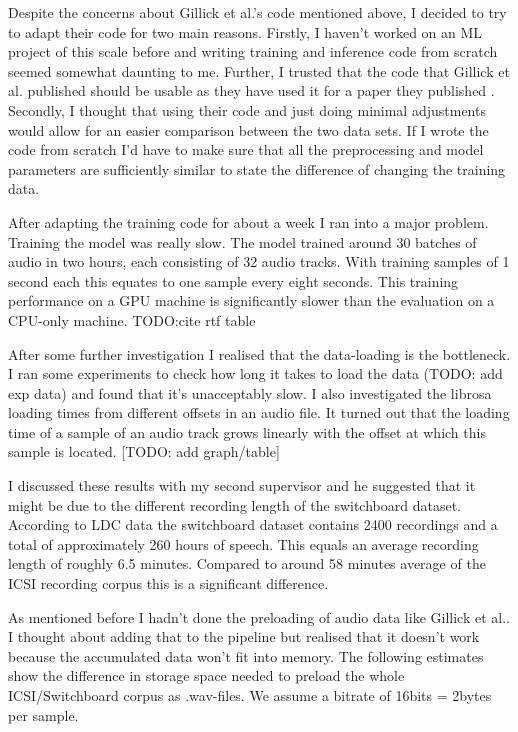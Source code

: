 \documentclass[bsc,frontabs,parskip,deptreport]{infthesis}
\begin{document}
Despite the concerns about Gillick et al.'s code mentioned above, I decided to try to adapt their code for two main reasons. 
Firstly, I haven't worked on an ML project of this scale before and writing training and inference code from scratch seemed somewhat daunting to me. Further, I trusted that the code that Gillick et al. published should be usable as they have used it for a paper they published \cite{gillick2021robust}. 
Secondly, I thought that using their code and just doing minimal adjustments would allow for an easier comparison between the two data sets. If I wrote the code from scratch I'd have to make sure that all the preprocessing and model parameters are sufficiently similar to state the difference of changing the training data. 

After adapting the training code for about a week I ran into a major problem. Training the model was really slow. The model trained around 30 batches of audio in two hours, each consisting of 32 audio tracks. 
With training samples of 1 second each this equates to one sample every eight seconds.
This training performance on a GPU machine is significantly slower than the evaluation on a CPU-only machine. TODO:cite rtf table

After some further investigation I realised that the data-loading is the bottleneck. I ran some experiments to check how long it takes to load the data (TODO: add exp data) and found that it's unacceptably slow. 
I also investigated the librosa loading times from different offsets in an audio file. It turned out that the loading time of a sample of an audio track grows linearly with the offset at which this sample is located. [TODO: add graph/table]

I discussed these results with my second supervisor and he suggested that it might be due to the different recording length of the switchboard dataset. According to LDC data \cite{switchboard-ldc} the switchboard dataset contains 2400 recordings and a total of approximately 260 hours of speech. This equals an average recording length of roughly 6.5 minutes. Compared to around 58 minutes average \cite{icsi-ldc} of the ICSI recording corpus this is a significant difference.


As mentioned before I hadn't done the preloading of audio data like Gillick et al.. 
I thought about adding that to the pipeline but realised that it doesn't work because the accumulated data won't fit into memory. 
The following estimates show the difference in storage space needed to preload the whole ICSI/Switchboard corpus as .wav-files. We assume a bitrate of 16bits = 2bytes per sample.
\end{document}
